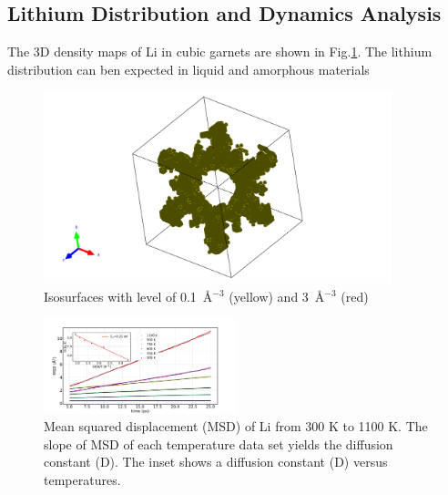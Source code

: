 \documentclass[twoside,twocolumn,9pt]{article}
\begin{document}
\subsection{Lithium Distribution and Dynamics Analysis}



The 3D density maps of Li in cubic garnets are shown in Fig.\ref{fig:pdfs}.
The lithium distribution can ben expected in liquid and amorphous materials

\begin{figure}[t]
\centering
\includegraphics[width=0.9\textwidth]{Pics/pdfs.pdf}
\caption{Isosurfaces with level of 0.1~\AA$^{-3}$ (yellow) and 3~\AA$^{-3}$ (red)}
\label{fig:pdfs}
\end{figure}

\begin{figure}[t]
\centering
\includegraphics[width=0.5\textwidth]{Pics/MSD.pdf}
\caption{Mean squared displacement (MSD) of Li from 300 K to 1100 K.
The slope of MSD of each temperature data set yields the diffusion constant (D).
The inset shows a diffusion constant (D) versus temperatures.}
\label{fig:msd}
\end{figure}


\end{document}
